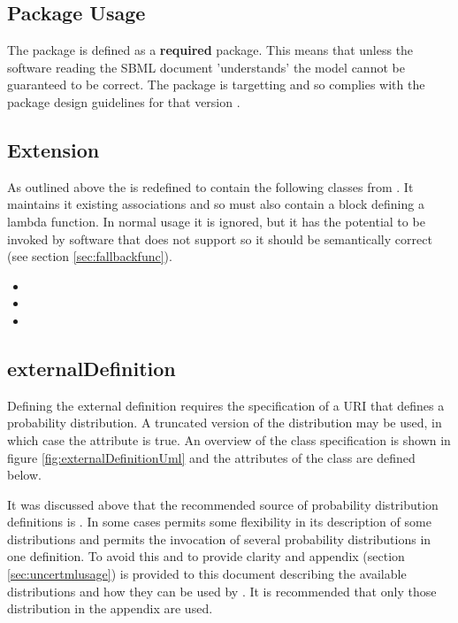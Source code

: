 \documentclass[draftspec]{sbmlpkgspec}
\begin{document}
\subsection{Package Usage}

The \distrib package is defined as a \textbf{required} package. This
means that unless the software reading the SBML document 'understands'
\distribshort the model cannot be guaranteed to be correct. The
package is targetting \sbmlverone and so complies with the package
design guidelines for that version \cite{sbmll3v1packrule}.

\subsection{\FunctionDefinition Extension}

As outlined above the \FunctionDefinition is redefined to contain the
following classes from \distribshort. It maintains it existing
associations and so must also contain a \mathml block defining a
lambda function. In normal usage it is ignored, but it has the
potential to be invoked by software that does not support \distribshort
so it should be semantically correct (see section \ref{sec:fallbackfunc}).

\begin{itemize}
  \item {}
  \item {}
  \item {}
\end{itemize}

\subsection{externalDefinition}
\label{sec:extlDefnDistn}

Defining the external definition requires the specification of a URI
that defines a probability distribution. A truncated version of the
distribution may be used, in which case the 
attribute is true. An overview of the class specification is shown in
figure \ref{fig:externalDefinitionUml} and the attributes of the class
are defined below.

It was discussed above that the recommended source of probability
distribution definitions is \uncertml. In some cases \uncertml permits
some flexibility in its description of some distributions and permits
the invocation of several probability distributions in one
definition. To avoid this and to provide clarity and appendix (section
\ref{sec:uncertmlusage}) is provided to this document describing the
available distributions and how they can be used by
\distribshort. It is recommended that only those distribution in the
appendix are used.
\end{document}
